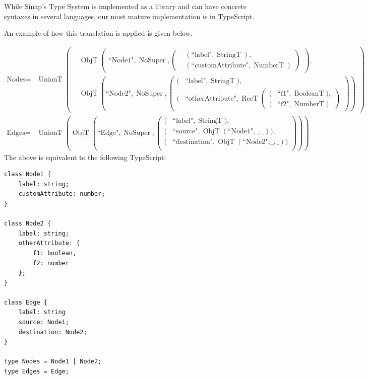\documentclass{article}
\DeclareMathOperator{\StringT}{StringT}
\DeclareMathOperator{\NumberT}{NumberT}
\DeclareMathOperator{\BooleanT}{BooleanT}
\DeclareMathOperator{\RecT}{RecT}
\DeclareMathOperator{\ObjT}{ObjT}
\DeclareMathOperator{\UnionT}{UnionT}
\DeclareMathOperator{\NoSuper}{NoSuper}
\begin{document}
While Sinap's Type System is implemented as a library and can have 
concrete syntaxes in several languages, our most mature implementation 
is in TypeScript. 

An example of how this translation is applied is given below.

\begin{align*}
    \text{Nodes} = &\UnionT\left(
        \begin{aligned}
        &\ObjT\left(
            \begin{aligned}    
                \text{``Node1"}, \NoSuper, \left(
                    \begin{aligned}
                        &(\text{``label"}, \StringT),  \\
                        &(\text{``customAttribute"}, \NumberT)
                    \end{aligned}\right)
            \end{aligned}\right),  \\
        &\ObjT\left(\text{``Node2"}, \NoSuper, \left(\begin{aligned}
            (&\text{``label"}, \StringT),  \\
            (&\text{``otherAttribute"}, \RecT\left(
                \begin{aligned}
                    (&\text{``f1"}, \BooleanT),  \\
                    (&\text{``f2"}, \NumberT)
                \end{aligned}\right)
        \end{aligned}\right)\right)
        \end{aligned}\right)  \\
    \text{Edges} = &\UnionT\left(\ObjT\left(
        \text{``Edge"}, \NoSuper,  
        \left(\begin{aligned}
            (&\text{``label"}, \StringT), \\
            (&\text{``source"}, \ObjT(\text{``Node1"}, \_, \_)), \\
            (&\text{``destination"}, \ObjT(\text{``Node2"}, \_, \_)) \\             
        \end{aligned}\right)\right)\right)
\end{align*}
The above is equivalent to the following TypeScript:

\begin{verbatim}
class Node1 {
    label: string;
    customAttribute: number;
}

class Node2 {
    label: string;
    otherAttribute: {
        f1: boolean,
        f2: number
    };
}

class Edge {
    label: string
    source: Node1;
    destination: Node2;
}

type Nodes = Node1 | Node2;
type Edges = Edge;
\end{verbatim}
\end{document}
